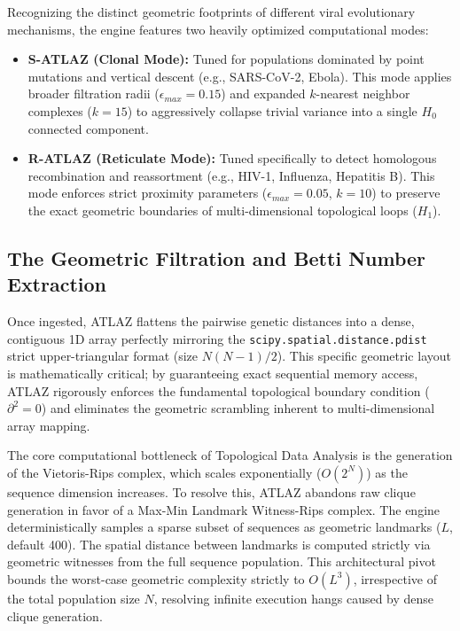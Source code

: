 Recognizing the distinct geometric footprints of different viral evolutionary mechanisms, the engine features two heavily optimized computational modes:
\begin{itemize}
    \item \textbf{S-ATLAZ (Clonal Mode):} Tuned for populations dominated by point mutations and vertical descent (e.g., SARS-CoV-2, Ebola). This mode applies broader filtration radii ($\epsilon_{max} = 0.15$) and expanded $k$-nearest neighbor complexes ($k=15$) to aggressively collapse trivial variance into a single $H_0$ connected component.
    \item \textbf{R-ATLAZ (Reticulate Mode):} Tuned specifically to detect homologous recombination and reassortment (e.g., HIV-1, Influenza, Hepatitis B). This mode enforces strict proximity parameters ($\epsilon_{max} = 0.05$, $k=10$) to preserve the exact geometric boundaries of multi-dimensional topological loops ($H_1$).
\end{itemize}

\subsection{The Geometric Filtration and Betti Number Extraction}
Once ingested, ATLAZ flattens the pairwise genetic distances into a dense, contiguous 1D array perfectly mirroring the \texttt{scipy.spatial.distance.pdist} strict upper-triangular format (size $N(N-1)/2$). This specific geometric layout is mathematically critical; by guaranteeing exact sequential memory access, ATLAZ rigorously enforces the fundamental topological boundary condition ($\partial^2 = 0$) and eliminates the geometric scrambling inherent to multi-dimensional array mapping.

The core computational bottleneck of Topological Data Analysis is the generation of the Vietoris-Rips complex, which scales exponentially ($O(2^N)$) as the sequence dimension increases. To resolve this, ATLAZ abandons raw clique generation in favor of a Max-Min Landmark Witness-Rips complex. The engine deterministically samples a sparse subset of sequences as geometric landmarks ($L$, default 400). The spatial distance between landmarks is computed strictly via geometric witnesses from the full sequence population. This architectural pivot bounds the worst-case geometric complexity strictly to $O(L^3)$, irrespective of the total population size $N$, resolving infinite execution hangs caused by dense clique generation.

